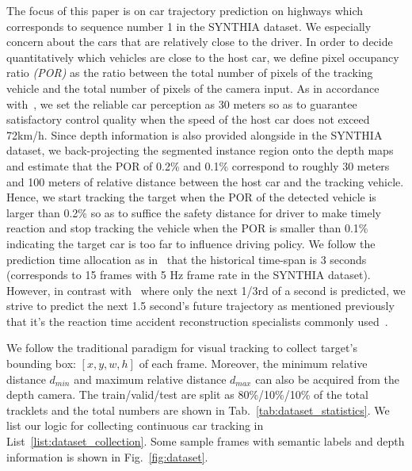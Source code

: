 \documentclass[10pt,twocolumn,letterpaper]{article}
\begin{document}
The focus of this paper is on car trajectory prediction on highways which corresponds to sequence number 1 in the SYNTHIA dataset. We especially concern about the cars that are relatively close to the driver.
In order to decide quantitatively which vehicles are close to the host car, we define pixel occupancy ratio \emph{(POR)} as the ratio between the total number of pixels of the tracking vehicle and the total number of pixels of the camera input.
As in accordance with~\cite{chen2015deepdriving}, we set the reliable car perception as 30 meters so as to guarantee satisfactory control quality when the speed of the host car does not exceed 72km/h.
Since depth information is also provided alongside in the SYNTHIA dataset, we back-projecting the segmented instance region onto the depth maps and estimate that the POR of 0.2\% and 0.1\% correspond to roughly 30 meters and 100 meters of relative distance between the host car and the tracking vehicle.
Hence, we start tracking the target when the POR of the detected vehicle is larger than 0.2\%  so as to suffice the safety distance for driver to make timely reaction and stop tracking the vehicle when the POR is smaller than 0.1\% indicating the target car is too far to influence driving policy.
We follow the prediction time allocation as in~\cite{xu2017end} that the historical time-span is 3 seconds (corresponds to 15 frames with 5 Hz frame rate in the SYNTHIA dataset).
However, in contrast with~\cite{xu2017end} where only the next 1/3rd of a second is predicted, we strive to predict the next 1.5 second's future trajectory as mentioned previously that it's the reaction time accident reconstruction specialists commonly used~\cite{mcgehee2000driver}.

We follow the traditional paradigm for visual tracking to collect target's bounding box: $[x, y, w, h]$ of each frame. Moreover, the minimum relative distance $d_{min}$ and maximum relative distance $d_{max}$ can also be acquired from the depth camera. The train/valid/test are split as 80\%/10\%/10\% of the total tracklets and the total numbers are shown in Tab.~\ref{tab:dataset_statistics}.
We list our logic for collecting continuous car tracking in List~\ref{list:dataset_collection}.
Some sample frames with semantic labels and depth information is shown in Fig.~\ref{fig:dataset}.

\end{document}
